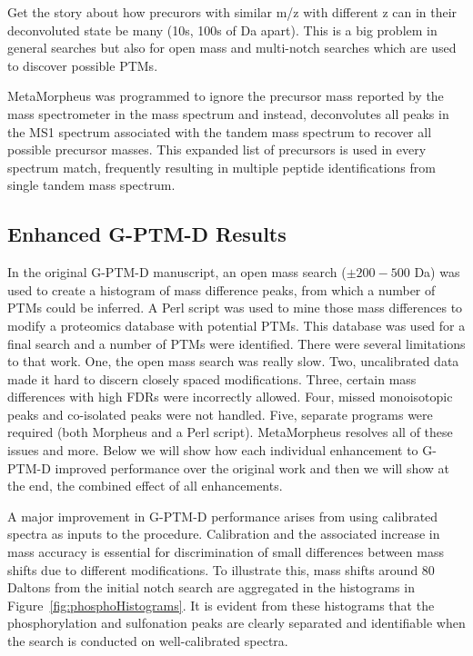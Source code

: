 \documentclass[journal=jprobs,manuscript=article]{achemso}
\begin{document}
Get the story about how precurors with similar m/z with different z can in their deconvoluted state be many (10s, 100s of Da apart).
This is a big problem in general searches but also for open mass and multi-notch searches which are used to discover possible PTMs.

MetaMorpheus was programmed to ignore the precursor mass reported by the mass spectrometer in the mass spectrum and instead, deconvolutes all peaks in the MS1 spectrum associated with the tandem mass spectrum to recover all possible precursor masses.
This expanded list of precursors is used in every spectrum match, frequently resulting in multiple peptide identifications from single tandem mass spectrum.


\subsection{Enhanced G-PTM-D Results}

In the original G-PTM-D manuscript, an open mass search ($\pm 200-500 $ Da) was used to create a histogram of mass difference peaks, from which a number of PTMs could be inferred.
A Perl script was used to mine those mass differences to modify a proteomics database with potential PTMs.
This database was used for a final search and a number of PTMs were identified.
There were several limitations to that work.
One, the open mass search was really slow.
Two, uncalibrated data made it hard to discern closely spaced modifications.
Three, certain mass differences with high FDRs were incorrectly allowed.
Four, missed monoisotopic peaks and co-isolated peaks were not handled.
Five, separate programs were required (both Morpheus and a Perl script).
MetaMorpheus resolves all of these issues and more.
Below we will show how each individual enhancement to G-PTM-D improved performance over the original work and then we will show at the end, the combined effect of all enhancements.

A major improvement in G-PTM-D performance arises from using calibrated spectra as inputs to the procedure.
Calibration and the associated increase in mass accuracy is essential for discrimination of small differences between mass shifts due to different modifications.
To illustrate this, mass shifts around 80 Daltons from the initial notch search are aggregated in the histograms in Figure~\ref{fig:phosphoHistograms}.
It is evident from these histograms that the phosphorylation and sulfonation peaks are clearly separated and identifiable when the search is conducted on well-calibrated spectra.
\end{document}
